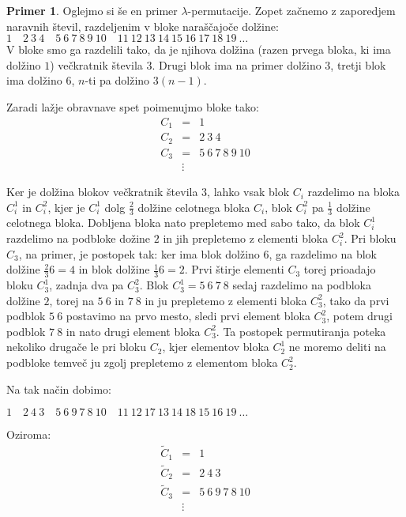 \documentclass[12pt,a4paper,reqno]{amsart}
\theoremstyle{definition} %
\newtheorem{primer}[definicija]{Primer}
\theoremstyle{plain} %
\begin{document}
\begin{primer}\label{pr:2}
Oglejmo si še en primer $\lambda$-permutacije. Zopet začnemo z zaporedjem naravnih števil, razdeljenim v bloke naraščajoče dolžine:\\
$1 \quad 2\: 3\: 4\quad 5\: 6\: 7\: 8\: 9\: 10 \quad 11\: 12\: 13\: 14\: 15\: 16\:17\: 18\: 19\: \ldots $\\
V bloke smo ga razdelili tako, da je njihova dolžina (razen prvega bloka, ki ima dolžino $1$) večkratnik števila $3$. Drugi blok ima na primer dolžino $3$, tretji blok ima dolžino $6$, $n$-ti pa dolžino $3(n-1)$. 

Zaradi lažje obravnave spet poimenujmo bloke tako:
\begin{eqnarray*}
C_1&=& 1\\
C_2&=& 2\: 3\: 4\\
C_3&=& 5\: 6\: 7\: 8\: 9\: 10\\
&\vdots &
\end{eqnarray*}

Ker je dolžina blokov večkratnik števila $3$, lahko vsak blok $C_i$ razdelimo na bloka $C_i^1$ in $C_i^2$, kjer je $C_i^1$ dolg $\frac{2}{3}$ dolžine celotnega bloka $C_i$, blok $C_i^2$ pa $\frac{1}{3}$ dolžine celotnega bloka. Dobljena bloka nato prepletemo med sabo tako, da blok $C_i^1$ razdelimo na podbloke dožine $2$ in jih prepletemo z elementi bloka $C_i^2$. 
Pri bloku $C_3$, na primer, je postopek tak: ker ima blok dolžino $6$, ga razdelimo na blok dolžine $\frac{2}{3} 6=4$ in blok dolžine $\frac{1}{3} 6=2$. Prvi štirje elementi $C_3$ torej prioadajo bloku $C_3^1$, zadnja dva pa $C_3^2$. Blok $C_3^1 = 5\ 6\ 7\ 8$ sedaj razdelimo na podbloka dolžine $2$, torej na $5\ 6$ in $7\ 8$ in ju prepletemo z elementi bloka $C_3^2$, tako da prvi podblok $5\ 6$ postavimo na prvo mesto, sledi prvi element bloka $C_3^2$, potem drugi podblok $7\ 8$ in nato drugi element bloka $C_3^2$. Ta postopek permutiranja poteka nekoliko drugače le pri bloku $C_2$, kjer elementov bloka $C_2^1$ ne moremo deliti na podbloke temveč ju zgolj prepletemo z elementom bloka $C_2^2$.

Na tak način dobimo:

$1 \quad 2\: 4\: 3\quad 5\: 6\: 9\: 7\: 8\: 10 \quad 11\: 12\: 17\: 13\: 14\: 18\: 15\: 16\: 19\: \ldots $

Oziroma:
\begin{eqnarray*}
\tilde{C}_1&=& 1\\
\tilde{C}_2&=& 2\: 4\: 3\\
\tilde{C}_3&=& 5\: 6\: 9\: 7\: 8\: 10\\
&\vdots &
\end{eqnarray*}


\end{primer}
\end{document}
